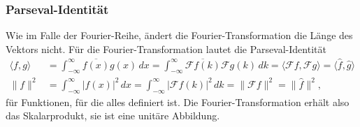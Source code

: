 \subsubsection{Parseval-Identität}
%
Wie im Falle der Fourier-Reihe, ändert die Fourier-Transformation
die Länge des Vektors nicht.
Für die Fourier-Transformation lautet die Parseval-Identität
\begin{align*}
\langle f,g\rangle
&=
\int_{-\infty}^\infty
\overline{f(x)} g(x)\,dx
=
\int_{-\infty}^\infty
\overline{ \mathscr{F}f(k) }
\mathscr{F}g(k)\,dk
=
\langle \mathscr{F}f,\mathscr{F}g\rangle
=
\langle\hat{f},\hat{g}\rangle
\\
\|f\|^2
&=
\int_{-\infty}^\infty
|f(x)|^2\,dx
=
\int_{-\infty}^\infty
|\mathscr{F}f(k)|^2\,dk
=
\|\mathscr{F}f\|^2
=
\|\hat{f}\|^2,
\end{align*}
für Funktionen, für die alles definiert ist.
Die Fourier-Transformation erhält also das Skalarprodukt,
sie ist eine unitäre Abbildung.
